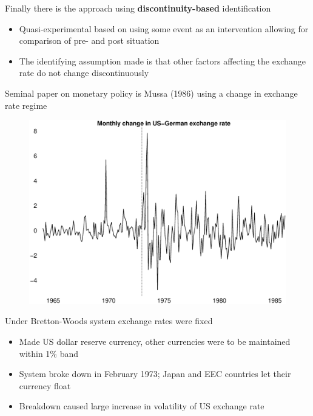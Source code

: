 \documentclass{beamer}
\begin{document}
\begin{frame}
  Finally there is the approach using \textbf{discontinuity-based} identification
  \medskip
  \begin{itemize}
    \item Quasi-experimental based on using some event as an intervention allowing for comparison of pre- and post situation 
    \item The identifying assumption made is that other factors affecting the exchange rate do not change discontinuously
  \end{itemize}
  \medskip
  Seminal paper on monetary policy is Mussa (1986) using a change in exchange rate regime
\end{frame}

\begin{frame}
  \begin{figure}
    \includegraphics[scale=.3]{exchange_rate.eps}
  \end{figure}  
\end{frame}

\begin{frame}
  Under Bretton-Woods system exchange rates were fixed
  \begin{itemize}
    \item Made US dollar reserve currency, other currencies were to be maintained within 1\% band
    \item System broke down in February 1973; Japan and EEC countries let their currency float
    \item Breakdown caused large increase in volatility of US exchange rate
  \end{itemize}
  \medskip  
\end{frame}
\end{document}
